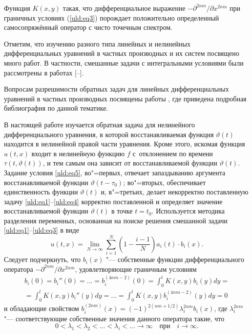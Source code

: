 Функция $K (x , y)$ такая, что дифференциальное выражение $-{\partial^{2 n m}}/{\partial x^{2 n m}}$ при граничных
условиях (\ref{uld:eq3}) порождает положительно определенный самосопряжённый оператор с чисто точечным спектром.

Отметим, что изучению разного типа линейных и нелинейных дифференциальных
уравнений в частных производных и их систем посвящено много работ. В частности, смешанные задачи с интегральными условиями были
рассмотрены в работах [--].

Вопросам разрешимости обратных задач для линейных дифференциальных уравнений
в частных производных посвящены работы \cite{uld:bib4,uld:bib5}, где приведена подробная библиография по данной тематике.

В настоящей работе изучается обратная задача для нелинейного дифференциального уравнения,  в которой восстанавливаемая функция $\vartheta  (t)$ находится в нелинейной правой части уравнения. 
Кроме этого, искомая функция $u (t, x)$ входит в нелинейную функцию $f$ с~отклонением по времени $ \tau  (t , \vartheta (t))$, и тем самым она зависит от восстанавливаемой функции $\vartheta  (t)$. 
Задание условия \eqref{uld:eq5}, во"=первых, отвечает запаздыванию  аргумента
восстанавливаемой функции $\vartheta  (t-\tau_0)$; во"=вторых,
обеспечивает единственность функции $\vartheta  (t)$ и, в"=третьих,
делает некорректно поставленную задачу \eqref{uld:eq1}--\eqref{uld:eq4}
корректно поставленной и определяет значение восстанавливаемой
функции $\vartheta  (t)$ в точке $t=t_0$. Используется
методика разделения переменных, основанная на поиске решения
смешанной задачи \eqref{uld:eq1}--\eqref{uld:eq3} в виде
\begin{equation}
\label{uld:eq6}
 u (t,  x)=\lim \limits_{N \to \infty} \sum \limits_{i =1}^N \left(1-\frac{i-1}{N}\right) a_i (t)\cdot b_i(x).
\end{equation}
Следует подчеркнуть, что $b_i (x)$ "--- собственные функции дифференциального оператора $- {\partial
 ^{2 n m}}/{\partial  x^{2 n m}}$, удовлетворяющие граничным
условиям
\begin{multline*}
b_i ( 0 )=b_i''( 0 )=\ldots =b_i^{(4 n m-2)} (0)=\int_0^l
K (x , y) b_i (y) d y= \\
=\int_0^l K (x , y) b_i''(y) d y=
\ldots =\int_0^l K (x , y) b_i^{(4 n m-2)} (y) d y=0
\end{multline*}
и обладающие свойством $b_i^{(2 n m)} (x)=(-1)^{2 (n m+1/2)}
\lambda_i^{ 2 n m}  b_i(x)$, где $\lambda_i^{2 n m}$ "--- соответствующие собственные значения данного оператора
такие, что
$$
0<\lambda_1 <\lambda _2 < \ldots <\lambda _i < \ldots  \to \infty  \quad \text{при} \quad i\to \infty.
$$

